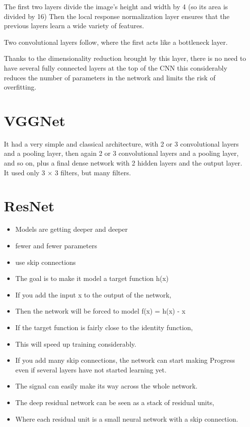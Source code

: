 \documentclass[11pt]{article}
\begin{document}
The first two layers divide the image's height and width by 4 (so
its area is divided by 16)
Then the local response normalization layer ensures that the
previous layers learn a wide variety of features.

Two convolutional layers follow, where the first acts like a
bottleneck layer. 

Thanks to the dimensionality reduction brought by this layer, 
there is no need to have several fully connected layers at the top of the CNN
this considerably reduces the number of parameters in the network and limits the risk of overfitting. 
\section{VGGNet}
\label{sec:orgb260749}
It had a very simple and classical architecture, 
with 2 or 3 convolutional layers and a pooling layer, 
then again 2 or 3 convolutional layers and a pooling layer, 
and so on, 
plus a final dense network with 2 hidden layers and the output layer. 
It used only 3 × 3 filters, but many filters.
\section{ResNet}
\label{sec:org8653ee4}
\begin{itemize}
\item Models are getting deeper and deeper
\item fewer and fewer parameters
\item use skip connections
\item The goal is to make it model a target function h(x)
\item If you add the input x to the output of the network,
\item Then the network will be forced to model f(x) = h(x) - x
\item If the target function is fairly close to the identity function,
\item This will speed up training considerably.
\item If you add many skip connections, the network can start making
Progress even if several layers have not started learning yet.
\item The signal can easily make its way across the whole network.
\item The deep residual network can be seen as a stack of residual units,
\item Where each residual unit is a small neural network with a skip connection.
\end{itemize}
\end{document}
